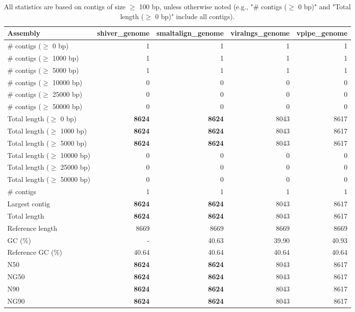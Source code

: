 \documentclass[12pt,a4paper]{article}
\begin{document}
\begin{table}[ht]
\begin{center}
\caption{All statistics are based on contigs of size $\geq$ 100 bp, unless otherwise noted (e.g., "\# contigs ($\geq$ 0 bp)" and "Total length ($\geq$ 0 bp)" include all contigs).}
\begin{tabular}{|l*{4}{|r}|}
\hline
Assembly & shiver\_genome & smaltalign\_genome & viralngs\_genome & vpipe\_genome \\ \hline
\# contigs ($\geq$ 0 bp) & 1 & 1 & 1 & 1 \\ \hline
\# contigs ($\geq$ 1000 bp) & 1 & 1 & 1 & 1 \\ \hline
\# contigs ($\geq$ 5000 bp) & 1 & 1 & 1 & 1 \\ \hline
\# contigs ($\geq$ 10000 bp) & 0 & 0 & 0 & 0 \\ \hline
\# contigs ($\geq$ 25000 bp) & 0 & 0 & 0 & 0 \\ \hline
\# contigs ($\geq$ 50000 bp) & 0 & 0 & 0 & 0 \\ \hline
Total length ($\geq$ 0 bp) & {\bf 8624} & {\bf 8624} & 8043 & 8617 \\ \hline
Total length ($\geq$ 1000 bp) & {\bf 8624} & {\bf 8624} & 8043 & 8617 \\ \hline
Total length ($\geq$ 5000 bp) & {\bf 8624} & {\bf 8624} & 8043 & 8617 \\ \hline
Total length ($\geq$ 10000 bp) & 0 & 0 & 0 & 0 \\ \hline
Total length ($\geq$ 25000 bp) & 0 & 0 & 0 & 0 \\ \hline
Total length ($\geq$ 50000 bp) & 0 & 0 & 0 & 0 \\ \hline
\# contigs & 1 & 1 & 1 & 1 \\ \hline
Largest contig & {\bf 8624} & {\bf 8624} & 8043 & 8617 \\ \hline
Total length & {\bf 8624} & {\bf 8624} & 8043 & 8617 \\ \hline
Reference length & 8669 & 8669 & 8669 & 8669 \\ \hline
GC (\%) & - & 40.63 & 39.90 & 40.93 \\ \hline
Reference GC (\%) & 40.64 & 40.64 & 40.64 & 40.64 \\ \hline
N50 & {\bf 8624} & {\bf 8624} & 8043 & 8617 \\ \hline
NG50 & {\bf 8624} & {\bf 8624} & 8043 & 8617 \\ \hline
N90 & {\bf 8624} & {\bf 8624} & 8043 & 8617 \\ \hline
NG90 & {\bf 8624} & {\bf 8624} & 8043 & 8617 \\ \hline

\end{tabular}
\end{center}
\end{table}
\end{document}
